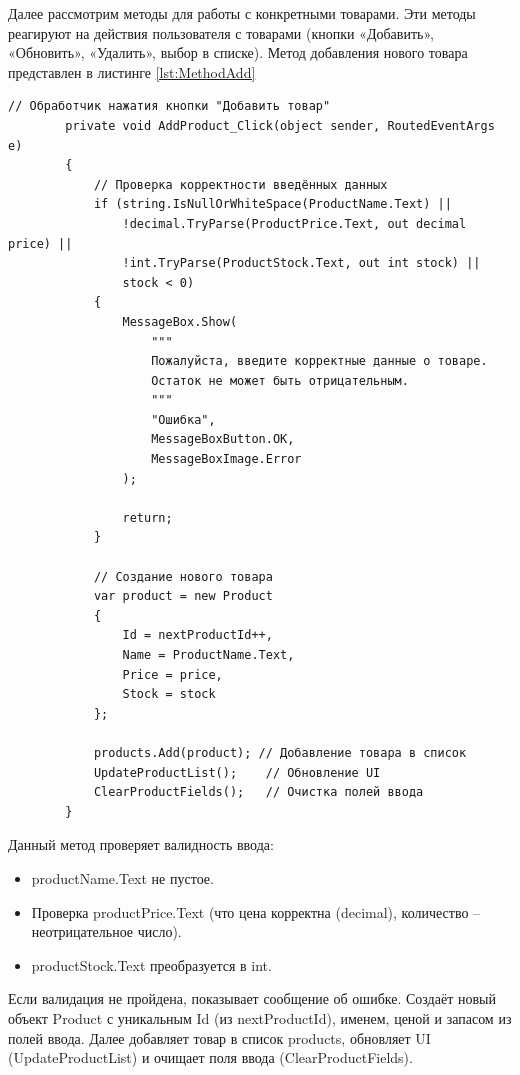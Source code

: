 \documentclass[12pt]{article}
\newcommand{\colorGIT}[1]{\textcolor{CtpGreen}{#1}}
\begin{document}
Далее рассмотрим методы для работы с конкретными товарами. Эти методы реагируют на действия пользователя с товарами (кнопки «Добавить», «Обновить», «Удалить», выбор в списке). Метод добавления нового товара представлен в листинге \ref{lst:MethodAdd}
\begin{lstlisting}[style=csharp_catppuccin, caption=\colorGIT{\href{https://github.com/WebMasterIT/Csharp_Labs/blob/ec375afd16c0647b337cf3d8a79c8bef904fc1be/3lab/StoreManager/MainWindow.xaml.cs\#L53-L80}{Метод}} добавления нового товара, label=lst:MethodAdd]
        // Обработчик нажатия кнопки "Добавить товар"
        private void AddProduct_Click(object sender, RoutedEventArgs e)
        {
            // Проверка корректности введённых данных
            if (string.IsNullOrWhiteSpace(ProductName.Text) ||
                !decimal.TryParse(ProductPrice.Text, out decimal price) ||
                !int.TryParse(ProductStock.Text, out int stock) ||
                stock < 0)
            {
                MessageBox.Show(
                    """
                    Пожалуйста, введите корректные данные о товаре.
                    Остаток не может быть отрицательным.
                    """
                    "Ошибка",
                    MessageBoxButton.OK,
                    MessageBoxImage.Error
                );

                return;
            }

            // Создание нового товара
            var product = new Product
            {
                Id = nextProductId++,
                Name = ProductName.Text,
                Price = price,
                Stock = stock
            };

            products.Add(product); // Добавление товара в список
            UpdateProductList();    // Обновление UI
            ClearProductFields();   // Очистка полей ввода
        }
\end{lstlisting}

\noindent Данный метод проверяет валидность ввода:
\begin{itemize}
	\item productName.Text не пустое.
	\item Проверка productPrice.Text (что цена корректна (decimal), количество -- неотрицательное число).
	\item productStock.Text преобразуется в int.
\end{itemize}

Если валидация не пройдена, показывает сообщение об ошибке. Создаёт новый объект Product с уникальным Id (из nextProductId), именем, ценой и запасом из полей ввода. Далее добавляет товар в список products, обновляет UI (UpdateProductList) и очищает поля ввода (ClearProductFields).
\end{document}
